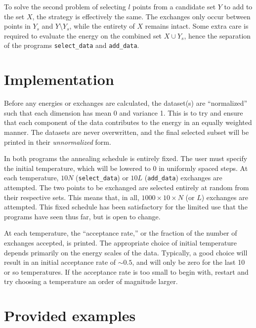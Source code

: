 \documentclass{article}
\begin{document}
To solve the second problem of selecting $l$ points from a candidate set $Y$ to add to the set $X$, the strategy is effectively the same.
The exchanges only occur between points in $Y_s$ and $Y \setminus Y_s$, while the entirety of $X$ remains intact.
Some extra care is required to evaluate the energy on the combined set $X \cup Y_s$, hence the separation of the programs \texttt{select\_data} and \texttt{add\_data}.

\section{Implementation}

Before any energies or exchanges are calculated, the dataset(s) are ``normalized'' such that each dimension has mean 0 and variance 1.
This is to try and ensure that each component of the data contributes to the energy in an equally weighted manner.
The datasets are never overwritten, and the final selected subset will be printed in their \emph{unnormalized} form.

In both programs the annealing schedule is entirely fixed.
The user must specify the initial temperature, which will be lowered to 0 in uniformly spaced steps.
At each temperature, $10 N$ (\texttt{select\_data}) or $10 L$ (\texttt{add\_data}) exchanges are attempted.
The two points to be exchanged are selected entirely at random from their respective sets.
This means that, in all, $1000 \times 10 \times N$ (or $L$) exchanges are attempted.
This fixed schedule has been satisfactory for the limited use that the programs have seen thus far, but is open to change.

At each temperature, the ``acceptance rate,'' or the fraction of the number of exchanges accepted, is printed.
The appropriate choice of initial temperature depends primarily on the energy scales of the data.
Typically, a good choice will result in an initial acceptance rate of $\sim 0.5$, and will only be zero for the last 10 or so temperatures.
If the acceptance rate is too small to begin with, restart and try choosing a temperature an order of magnitude larger.

\section{Provided examples}
\end{document}
